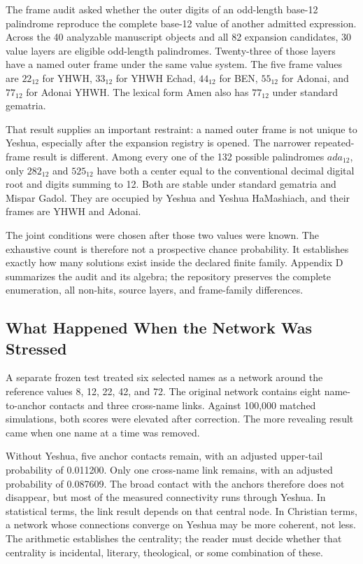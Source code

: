 The frame audit asked whether the outer digits of an odd-length base-12 palindrome reproduce the complete base-12 value of another admitted expression. Across the 40 analyzable manuscript objects and all 82 expansion candidates, 30 value layers are eligible odd-length palindromes. Twenty-three of those layers have a named outer frame under the same value system. The five frame values are $22_{12}$ for YHWH, $33_{12}$ for YHWH Echad, $44_{12}$ for BEN, $55_{12}$ for Adonai, and $77_{12}$ for Adonai YHWH. The lexical form Amen also has $77_{12}$ under standard gematria.

That result supplies an important restraint: a named outer frame is not unique to Yeshua, especially after the expansion registry is opened. The narrower repeated-frame result is different. Among every one of the 132 possible palindromes $ada_{12}$, only $282_{12}$ and $525_{12}$ have both a center equal to the conventional decimal digital root and digits summing to 12. Both are stable under standard gematria and Mispar Gadol. They are occupied by Yeshua and Yeshua HaMashiach, and their frames are YHWH and Adonai.

The joint conditions were chosen after those two values were known. The exhaustive count is therefore not a prospective chance probability. It establishes exactly how many solutions exist inside the declared finite family. Appendix D summarizes the audit and its algebra; the repository preserves the complete enumeration, all non-hits, source layers, and frame-family differences.

\subsection{What Happened When the Network Was Stressed}

A separate frozen test treated six selected names as a network around the reference values 8, 12, 22, 42, and 72. The original network contains eight name-to-anchor contacts and three cross-name links. Against 100,000 matched simulations, both scores were elevated after correction. The more revealing result came when one name at a time was removed.

Without Yeshua, five anchor contacts remain, with an adjusted upper-tail probability of 0.011200. Only one cross-name link remains, with an adjusted probability of 0.087609. The broad contact with the anchors therefore does not disappear, but most of the measured connectivity runs through Yeshua. In statistical terms, the link result depends on that central node. In Christian terms, a network whose connections converge on Yeshua may be more coherent, not less. The arithmetic establishes the centrality; the reader must decide whether that centrality is incidental, literary, theological, or some combination of these.

